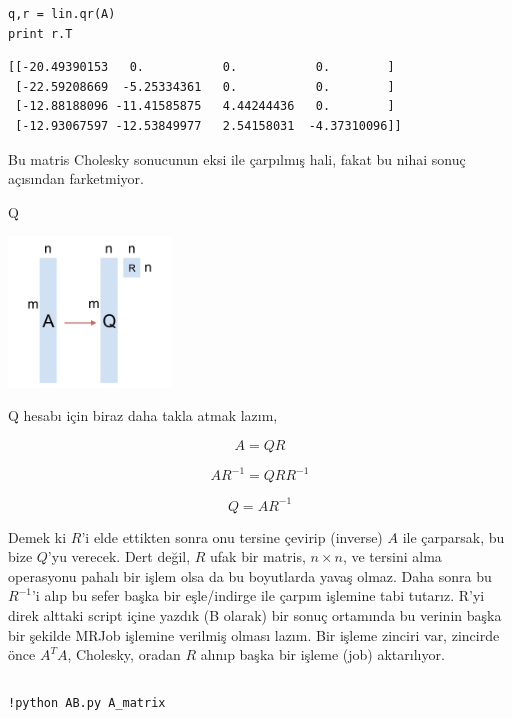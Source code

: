 \documentclass[12pt,fleqn]{article}\usepackage{../../common}
\begin{document}
\begin{verbatim}
q,r = lin.qr(A)
print r.T
\end{verbatim}

\begin{verbatim}
[[-20.49390153   0.           0.           0.        ]
 [-22.59208669  -5.25334361   0.           0.        ]
 [-12.88188096 -11.41585875   4.44244436   0.        ]
 [-12.93067597 -12.53849977   2.54158031  -4.37310096]]
\end{verbatim}

Bu matris Cholesky sonucunun eksi ile çarpılmış hali, fakat bu nihai sonuç
açısından farketmiyor. 

Q

\includegraphics[height=4cm]{qr.png}

Q hesabı için biraz daha takla atmak lazım,

$$A = QR$$

$$AR^{-1} = QRR^{-1} $$

$$Q = AR^{-1} $$

Demek ki $R$'i elde ettikten sonra onu tersine çevirip (inverse) $A$ ile
çarparsak, bu bize $Q$'yu verecek. Dert değil, $R$ ufak bir matris, $n \times
n$, ve tersini alma operasyonu pahalı bir işlem olsa da bu boyutlarda yavaş
olmaz. Daha sonra bu $R^{-1}$'i alıp bu sefer başka bir eşle/indirge ile çarpım
işlemine tabi tutarız. R'yi direk alttaki script içine yazdık (B olarak) bir
sonuç ortamında bu verinin başka bir şekilde MRJob işlemine verilmiş olması
lazım. Bir işleme zinciri var, zincirde önce $A^TA$, Cholesky, oradan $R$ alınıp
başka bir işleme (job) aktarılıyor.

\inputminted[fontsize=\footnotesize]{python}{AB.py}

\begin{verbatim}
!python AB.py A_matrix
\end{verbatim}
\end{document}
